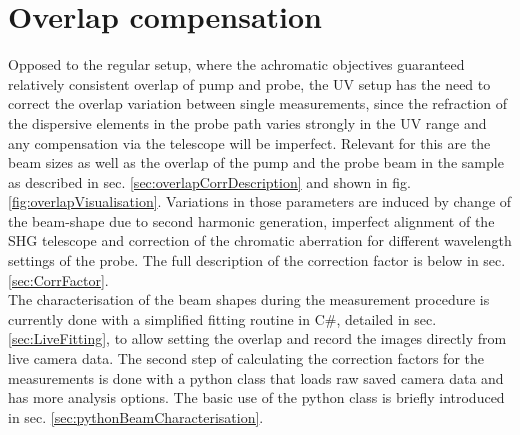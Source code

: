 \documentclass[twoside,openright,listof=numbered]{scrreprt}
\begin{document}
\section{Overlap compensation}
Opposed to the regular setup, where the achromatic objectives guaranteed relatively consistent overlap of pump and probe, the UV setup has the need to correct the overlap variation between single measurements, since the refraction of the dispersive elements in the probe path varies strongly in the UV range and any compensation via the telescope will be imperfect.\newline
Relevant for this are the beam sizes as well as the overlap of the pump and the probe beam in the sample as described in sec. \ref{sec:overlapCorrDescription} and shown in fig. \ref{fig:overlapVisualisation}. Variations in those parameters are induced by change of the beam-shape due to second harmonic generation, imperfect alignment of the SHG telescope and correction of the chromatic aberration for different wavelength settings of the probe. The full description of the correction factor is below in sec. \ref{sec:CorrFactor}.\\

The characterisation of the beam shapes during the measurement procedure is currently done with a simplified fitting routine in C\#, detailed in sec. \ref{sec:LiveFitting}, to allow setting the overlap and record the images directly from live camera data. The second step of calculating the correction factors for the measurements is done with a python class that loads raw saved camera data and has more analysis options. The basic use of the python class is briefly introduced in sec. \ref{sec:pythonBeamCharacterisation}.
\end{document}
